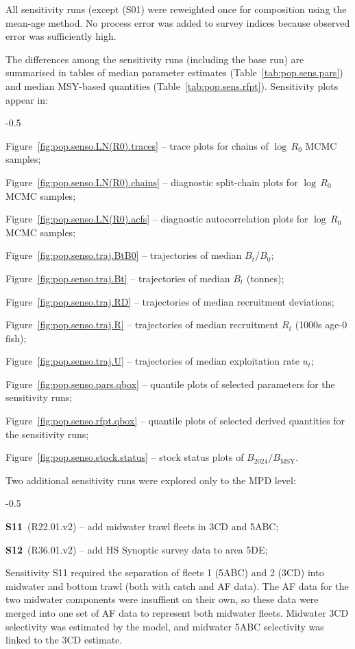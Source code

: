 \documentclass[11pt]{book}
\newcommand{\Bmsy}{B_\text{MSY}}
\newcommand{\Bcurr}{B_{2024}}
\begin{document}
All sensitivity runs (except (S01) were reweighted once for composition using the \citet{Francis:2011} mean-age method. 
No process error was added to survey indices because observed error was sufficiently high.

The differences among the sensitivity runs (including the base run) are summarised in tables of median parameter estimates (Table~\ref{tab:pop.sens.pars}) and median MSY-based quantities (Table~\ref{tab:pop.sens.rfpt}).
Sensitivity plots appear in:
\begin{itemize_csas}{-0.5}{}
  \item Figure~\ref{fig:pop.senso.LN(R0).traces} -- trace plots for chains of $\log\,R_0$ MCMC samples;
  \item Figure~\ref{fig:pop.senso.LN(R0).chains} -- diagnostic split-chain plots for $\log\,R_0$ MCMC samples;
  \item Figure~\ref{fig:pop.senso.LN(R0).acfs} -- diagnostic autocorrelation plots for $\log\,R_0$ MCMC samples;
  \item Figure~\ref{fig:pop.senso.traj.BtB0} -- trajectories of median $B_t/B_0$;
  \item Figure~\ref{fig:pop.senso.traj.Bt} -- trajectories of median $B_t$ (tonnes);
  \item Figure~\ref{fig:pop.senso.traj.RD} -- trajectories of median recruitment deviations;
  \item Figure~\ref{fig:pop.senso.traj.R} -- trajectories of median recruitment $R_t$ (1000s age-0 fish);
  \item Figure~\ref{fig:pop.senso.traj.U} -- trajectories of median exploitation rate $u_t$;
  \item Figure~\ref{fig:pop.senso.pars.qbox} -- quantile plots of selected parameters for the sensitivity runs;
  \item Figure~\ref{fig:pop.senso.rfpt.qbox} -- quantile plots of selected derived quantities for the sensitivity runs;
  \item Figure~\ref{fig:pop.senso.stock.status} -- stock status plots of $\Bcurr/\Bmsy$.
 \end{itemize_csas}

\medskip
Two additional sensitivity runs were explored only to the MPD level:
\begin{itemize_csas}{-0.5}{}
  \item \textbf{S11}~(R22.01.v2)  -- add midwater trawl fleets in 3CD and 5ABC;
  \item \textbf{S12}~(R36.01.v2)  -- add HS Synoptic survey data to area 5DE;
\end{itemize_csas}
Sensitivity S11 required the separation of fleets 1 (5ABC) and 2 (3CD) into midwater and bottom trawl (both with catch and AF data).
The AF data for the two midwater components were insuffient on their own, so these data were merged into one set of AF data to represent both midwater fleets.
Midwater 3CD selectivity was estimated by the model, and midwater 5ABC selectivity was linked to the 3CD estimate.
\end{document}
